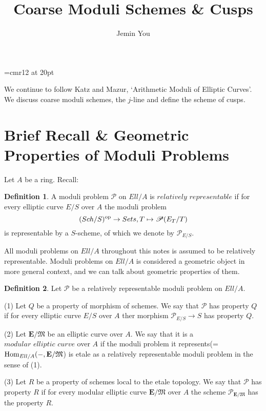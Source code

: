 \documentclass[a4paper,11pt]{article}
\begin{document}
\theoremstyle{plain}
\newtheorem{thm}{Theorem}[section]
\newtheorem{prp}[thm]{Proposition}
\newtheorem{lem}[thm]{Lemma}

\theoremstyle{definition}
\newtheorem{defn}[thm]{Definition}
\newtheorem{exm}[thm]{Example}
\newtheorem{nota}[thm]{Notation}

\theoremstyle{remark}
\newtheorem{rem}[thm]{Remark}



\font\myfont=cmr12 at 20pt

\title{\vspace{-5ex} \myfont Coarse Moduli Schemes \& Cusps}
\author{Jemin You}
\date{\vspace{-5ex}}
\maketitle

\setcounter{section}{-1}

We continue to follow Katz and Mazur, `Arithmetic Moduli of Elliptic Curves'.
We discuss coarse moduli schemes, the $j$-line and define the scheme of cusps.

\section{Brief Recall \& Geometric Properties of Moduli Problems}

Let $A$ be a ring.
Recall:

\begin{defn}
A moduli problem $\mathcal{P}$ on $Ell/A$ is $\textit{relatively representable}$ if for every elliptic curve $E/S$ over $A$ the moduli problem
\[
(Sch/S)^{\textnormal{op}} \to Sets, T \mapsto \mathcal{P}(E_T/T)
\]
is representable by a $S$-scheme, of which we denote by $\mathcal{P}_{E/S}$.

\end{defn}

All moduli problems on $Ell/A$ throughout this notes is assumed to be relatively representable.
Moduli problems on $Ell/A$ is considered a geometric object in more general context, and we can talk about geometric properties of them.

\begin{defn}
Let $\mathcal{P}$ be a relatively representable moduli problem on $Ell/A$.

(1) Let $Q$ be a property of morphism of schemes.
We say that $\mathcal{P}$ has property $Q$ if for every elliptic curve $E/S$ over $A$ ther morphism $\mathcal{P}_{E/S}\to$$S$ has property $Q$.

(2) Let $\textbf{E}/\mathfrak{M}$ be an elliptic curve over $A$.
We say that it is a $\textit{modular elliptic curve}$ over $A$ if the moduli problem it represents(=$\textnormal{Hom}_{Ell/A}(-,\textbf{E}/\mathfrak{M}$) is etale as a relatively representable moduli problem in the sense of (1).

(3) Let $R$ be a property of schemes local to the etale topology.
We say that $\mathcal{P}$ has property $R$ if for every modular elliptic curve $\textbf{E}/\mathfrak{M}$ over $A$ the scheme $\mathcal{P}_{\textbf{E}/\mathfrak{M}}$ has the property $R$.
\end{defn}
\end{document}

